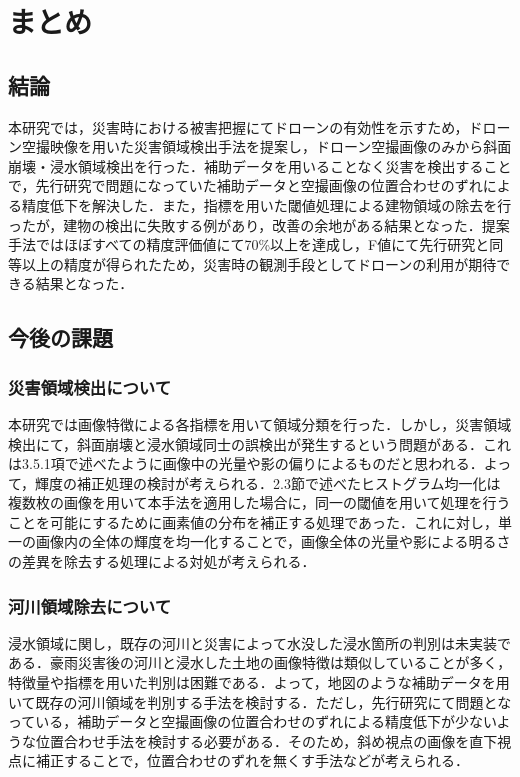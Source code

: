 \documentclass[../Thesis]{subfiles}
\begin{document}
\chapter{まとめ}
\section{結論}
	本研究では，災害時における被害把握にてドローンの有効性を示すため，ドローン空撮映像を用いた災害領域検出手法を提案し，ドローン空撮画像のみから斜面崩壊・浸水領域検出を行った．補助データを用いることなく災害を検出することで，先行研究で問題になっていた補助データと空撮画像の位置合わせのずれによる精度低下を解決した．また，指標を用いた閾値処理による建物領域の除去を行ったが，建物の検出に失敗する例があり，改善の余地がある結果となった．提案手法ではほぼすべての精度評価値にて70\%以上を達成し，F値にて先行研究と同等以上の精度が得られたため，災害時の観測手段としてドローンの利用が期待できる結果となった．

\section{今後の課題}
\subsection{災害領域検出について}
	本研究では画像特徴による各指標を用いて領域分類を行った．しかし，災害領域検出にて，斜面崩壊と浸水領域同士の誤検出が発生するという問題がある．これは3.5.1項で述べたように画像中の光量や影の偏りによるものだと思われる．よって，輝度の補正処理の検討が考えられる．2.3節で述べたヒストグラム均一化は複数枚の画像を用いて本手法を適用した場合に，同一の閾値を用いて処理を行うことを可能にするために画素値の分布を補正する処理であった．これに対し，単一の画像内の全体の輝度を均一化することで，画像全体の光量や影による明るさの差異を除去する処理による対処が考えられる．
	
\subsection{河川領域除去について}
	浸水領域に関し，既存の河川と災害によって水没した浸水箇所の判別は未実装である．豪雨災害後の河川と浸水した土地の画像特徴は類似していることが多く，特徴量や指標を用いた判別は困難である．よって，地図のような補助データを用いて既存の河川領域を判別する手法を検討する．ただし，先行研究にて問題となっている，補助データと空撮画像の位置合わせのずれによる精度低下が少ないような位置合わせ手法を検討する必要がある．そのため，斜め視点の画像を直下視点に補正することで，位置合わせのずれを無くす手法などが考えられる．
\end{document}
